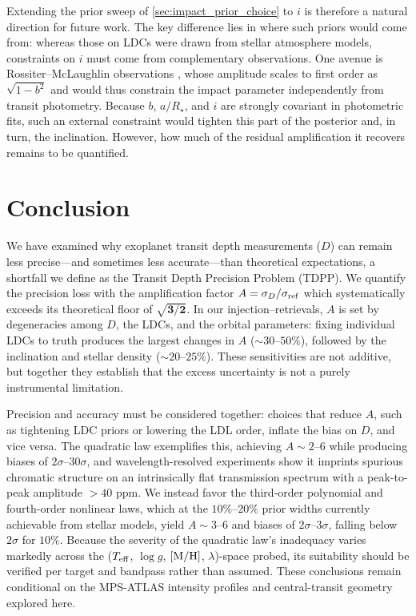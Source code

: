 \documentclass[twocolumn]{aastex631}
\newcommand{\vtwo}[1]{{#1}}
\begin{document}
\vtwo{Extending the prior sweep of \autoref{sec:impact_prior_choice} to $i$ is therefore a natural direction for future work. The key difference lies in where such priors would come from: whereas those on LDCs were drawn from stellar atmosphere models, constraints on $i$ must come from complementary observations. One avenue is Rossiter--McLaughlin observations \citep{Rossiter1924, McLaughlin1924}, whose amplitude scales to first order as $\sqrt{1-b^2}$ \citep{Triaud2018} and would thus constrain the impact parameter independently from transit photometry. Because $b$, $a/R_\star$, and $i$ are strongly covariant in photometric fits, such an external constraint would tighten this part of the posterior and, in turn, the inclination. However, how much of the residual amplification it recovers remains to be quantified.}

\section{Conclusion}\label{sec:conclusion}
\vtwo{We have examined why exoplanet transit depth measurements ($D$) can remain less precise---and sometimes less accurate---than theoretical expectations, a shortfall we define as the Transit Depth Precision Problem (TDPP). We quantify the precision loss with the amplification factor $A = \sigma_D/\sigma_{\rm ref}$ which systematically exceeds its theoretical floor of $\mathbf{\sqrt{3/2}}$. In our injection--retrievals, $A$ is set by degeneracies among $D$, the LDCs, and the orbital parameters: fixing individual LDCs to truth produces the largest changes in $A$ ($\sim30$--$50\%$), followed by the inclination and stellar density ($\sim20$--$25\%$). These sensitivities are not additive, but together they establish that the excess uncertainty is not a purely instrumental limitation.}

\vtwo{Precision and accuracy must be considered together: choices that reduce $A$, such as tightening LDC priors or lowering the LDL order, inflate the bias on $D$, and vice versa. The quadratic law exemplifies this, achieving $A\sim2$--$6$ while producing biases of $2\sigma$--$30\sigma$, and wavelength-resolved experiments show it imprints spurious chromatic structure on an intrinsically flat transmission spectrum with a peak-to-peak amplitude $>40$ ppm. We instead favor the third-order polynomial and fourth-order nonlinear laws, which at the $10\%$--$20\%$ prior widths currently achievable from stellar models, yield $A \sim 3$--$6$ and biases of $2\sigma$--$3\sigma$, falling below $2\sigma$ for $10\%$. Because the severity of the quadratic law's inadequacy varies markedly across the ($T_{\rm eff}$, $\log g$, $[{\rm M/H}]$, $\lambda$)-space probed, its suitability should be verified per target and bandpass rather than assumed. These conclusions remain conditional on the MPS-ATLAS intensity profiles and central-transit geometry explored here.}
\end{document}
